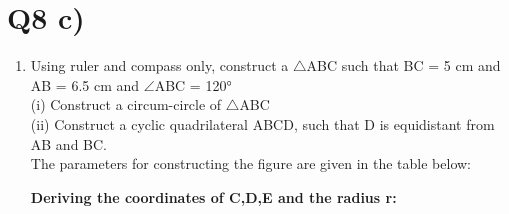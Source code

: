 \documentclass[journal,12pt,twocolumn]{IEEEtran}
\renewcommand\thesection{\arabic{section}}
\begin{document}
\section{Q8 c)}
\begin{enumerate}[label=\thesection.\arabic*.,ref=\thesection.\theenumi]
\item Using ruler and compass only, construct a $\bigtriangleup$ABC such that BC = 5 cm
and AB = 6.5 cm and $\angle$ABC = 120°\\
(i) Construct a circum-circle of $\bigtriangleup$ABC\\
(ii) Construct a cyclic quadrilateral ABCD, such that D is equidistant from AB and BC.\\

\solution The parameters for constructing the figure are given in the table below:

\begin{table}[h]
\centering
\caption{}
 	
\label{TABLE}
\end{table}

\textbf{Deriving the coordinates of C,D,E and the radius r:}\\


\end{enumerate}
\end{document}
